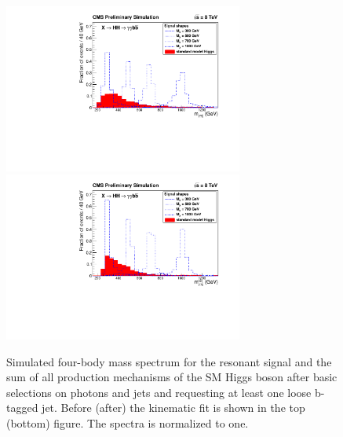 \begin{figure}[ht]
 \begin{center}
   \includegraphics[width=0.70\textwidth]{figures/selection/TotalMass_OnlyHiggs.pdf}
   \includegraphics[width=0.70\textwidth]{figures/selection/TotalMassKinFit_OnlyHiggs.pdf}
 \end{center}
\caption{Simulated four-body mass spectrum for the resonant signal and the sum of all production
mechanisms of the
SM Higgs boson after basic selections on photons and jets and requesting at least
one loose b-tagged jet. Before (after) the kinematic fit is shown in the top (bottom) figure.
The spectra is normalized to one.}
\label{fig:mggjj_onlyhiggs}
\end{figure}


